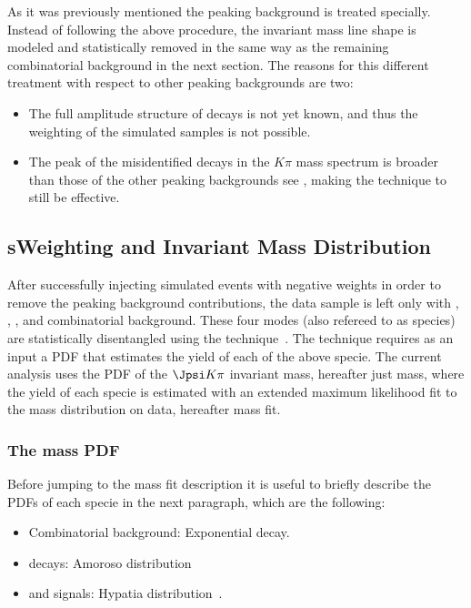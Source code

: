 As it was previously mentioned the \LbJpsippi peaking background is treated specially. Instead of following the above
procedure, the \LbJpsippi invariant mass line shape is modeled and statistically removed in the same way as the remaining
combinatorial background in the next section. The reasons for this different treatment with respect to other
peaking backgrounds are two:
\begin{itemize}
\item The full amplitude structure of \LbJpsippi decays is not yet known, and thus the weighting of the simulated samples is not possible. 
\item The peak of the misidentified \LbJpsippi decays in the \Jpsi$K\pi$ mass spectrum is broader than those of the other
      peaking backgrounds see , making the \sPlot technique to still be effective.  
\end{itemize}

\subsection{sWeighting and Invariant Mass Distribution}
\label{sWeighting_and_mass}

After successfully injecting simulated events with negative weights in order to remove the peaking background contributions, the data sample is left only with
\BdJpsiKpi, \BsJpsiKpi, \LbJpsippi, and combinatorial background. These four modes (also refereed to as species) are statistically 
disentangled using the \sPlot technique~\cite{splot}. The technique requires as an input a PDF that estimates the yield of each 
of the above specie. The current analysis uses the PDF of the $\Jpsi K\pi$ invariant mass, hereafter just mass, where the yield of each specie
is estimated with an extended maximum likelihood fit to the mass distribution on data, hereafter mass fit. 

\subsubsection{The mass PDF}
Before jumping to the mass fit description it is useful to briefly describe the PDFs of each specie in the next paragraph, which are the following:  

\begin{itemize}
\item Combinatorial background: Exponential decay.
\item \LbJpsippi decays: Amoroso distribution~\cite{Amoroso}
\item \Bd and \Bs signals: Hypatia distribution~\cite{Santos:2013gra}.
\end{itemize}

